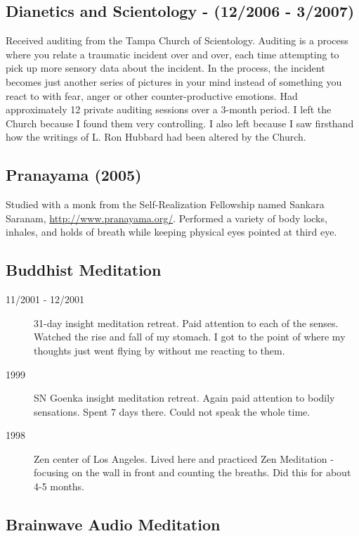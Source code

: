 \documentclass[12pt]{article}%
\begin{document}
\subsection{Dianetics and Scientology - (12/2006 - 3/2007)}

Received auditing from the Tampa Church of Scientology. Auditing is a process where you relate a traumatic incident over and over, each time attempting to pick up more sensory data about the incident. In the process, the incident becomes just another series of pictures in your mind instead of something you react to with fear, anger or other counter-productive emotions. Had approximately 12 private auditing sessions over a 3-month period. I left the Church because I found them very controlling. I also left because I saw firsthand how the writings of L. Ron Hubbard had been altered by the Church. 

\subsection{Pranayama (2005)}

Studied with a monk from the Self-Realization Fellowship named Sankara Saranam, \url{http://www.pranayama.org/}. Performed a variety of body locks, inhales, and holds of breath while keeping physical eyes pointed at third eye.

\subsection{Buddhist Meditation}

\begin{description}
	\item[11/2001 - 12/2001] 31-day insight meditation retreat. Paid attention to each of the senses. Watched the rise and fall of my stomach. I got to the point of where my thoughts just went flying by without me reacting to them. 
	\item[1999] SN Goenka insight meditation retreat. Again paid attention to bodily sensations. Spent 7 days there. Could not speak the whole time.
	 \item[1998] Zen center of Los Angeles. Lived here and practiced Zen Meditation - focusing on the wall in front and counting the breaths. Did this for about 4-5 months.
 
\end{description}

\subsection{Brainwave Audio Meditation}
\end{document}
